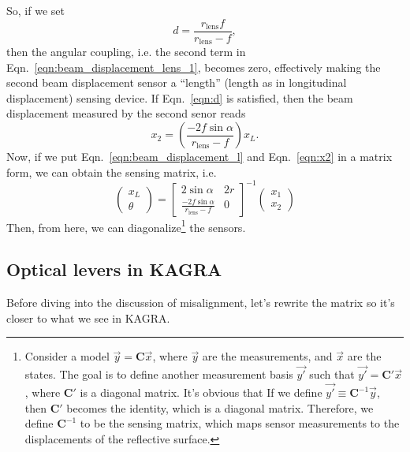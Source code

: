 So, if we set
\begin{equation}
	d=\frac{r_\mathrm{lens}f}{r_\mathrm{lens}-f},
	\label{eqn:d}
\end{equation}
then the angular coupling, i.e. the second term in Eqn.~\eqref{eqn:beam_displacement_lens_1}, becomes zero, effectively making the second beam displacement sensor a ``length'' (length as in longitudinal displacement) sensing device.
If Eqn.~\eqref{eqn:d} is satisfied, then the beam displacement measured by the second senor reads
\begin{equation}
	x_2 = \left(\frac{-2f\sin\alpha}{r_\mathrm{lens}-f}\right)x_L.
	\label{eqn:x2}
\end{equation}
Now, if we put Eqn.~\eqref{eqn:beam_displacement_l} and Eqn.~\eqref{eqn:x2} in a matrix form, we can obtain the sensing matrix, i.e.
\begin{equation}
	\begin{pmatrix}
		x_L\\
		\theta
	\end{pmatrix}
	=
	\begin{bmatrix}
		2\sin\alpha & 2r\\
		\frac{-2f\sin\alpha}{r_\mathrm{lens}-f} & 0
	\end{bmatrix}^{-1}
	\begin{pmatrix}
		x_1\\
		x_2
	\end{pmatrix}
\end{equation}
Then, from here, we can diagonalize\footnote{
Consider a model $\vec{y}=\mathbf{C}\vec{x}$, where $\vec{y}$ are the measurements, and $\vec{x}$ are the states.
The goal is to define another measurement basis $\vec{y'}$ such that $\vec{y'}=\mathbf{C'}\vec{x}$, where $\mathbf{C'}$ is a diagonal matrix.
It's obvious that If we define $\vec{y'}\equiv\mathbf{C}^{-1}\vec{y}$, then $\mathbf{C'}$ becomes the identity, which is a diagonal matrix.
Therefore, we define $\mathbf{C}^\mathrm{-1}$ to be the sensing matrix, which maps sensor measurements to the displacements of the reflective surface.
}
the sensors.

\subsection{Optical levers in KAGRA \label{sec:optical_levers_in_kagra}}
Before diving into the discussion of misalignment, let's rewrite the matrix so it's closer to what we see in KAGRA.


